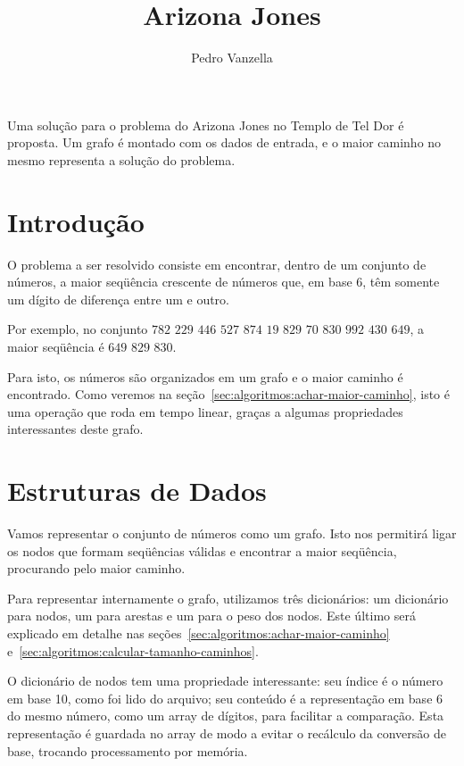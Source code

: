 \documentclass[12pt]{article}
\title{Arizona Jones}
\author{Pedro Vanzella\inst{1}}
\begin{document}
\maketitle
\begin{resumo}
  Uma solu\c{c}ão para o problema do Arizona Jones no Templo de Tel Dor é proposta. Um grafo é montado com os dados de entrada, e o maior caminho no mesmo representa a solução do problema.
\end{resumo}


\section{Introdução}\label{sec:intro}

O problema a ser resolvido consiste em encontrar, dentro de um conjunto de números, a maior seqüência crescente de números que, em base 6, têm somente um dígito de diferen\c{c}a entre um e outro. 

Por exemplo, no conjunto $782$ $229$ $446$ $527$ $874$ $19$ $829$ $70$ $830$ $992$ $430$ $649$, a maior seqüência é $649$ $829$ $830$.

Para isto, os números são organizados em um grafo e o maior caminho é encontrado. Como veremos na se\c{c}ão~\ref{sec:algoritmos:achar-maior-caminho}, isto é uma opera\c{c}ão que roda em tempo linear, gra\c{c}as a algumas propriedades interessantes deste grafo.

\section{Estruturas de Dados}\label{sec:estruturas}
Vamos representar o conjunto de números como um grafo. Isto nos permitirá ligar os nodos que formam seqüências válidas e encontrar a maior seqüência, procurando pelo maior caminho.

Para representar internamente o grafo, utilizamos três dicionários: um dicionário para nodos, um para arestas e um para o peso dos nodos. Este último será explicado em detalhe nas se\c{c}ões~\ref{sec:algoritmos:achar-maior-caminho} e~\ref{sec:algoritmos:calcular-tamanho-caminhos}.

O dicionário de nodos tem uma propriedade interessante: seu índice é o número em base 10, como foi lido do arquivo; seu conteúdo é a representa\c{c}ão em base 6 do mesmo número, como um array de dígitos, para facilitar a compara\c{c}ão. Esta representa\c{c}ão é guardada no array de modo a evitar o recálculo da conversão de base, trocando processamento por memória.
\end{document}
